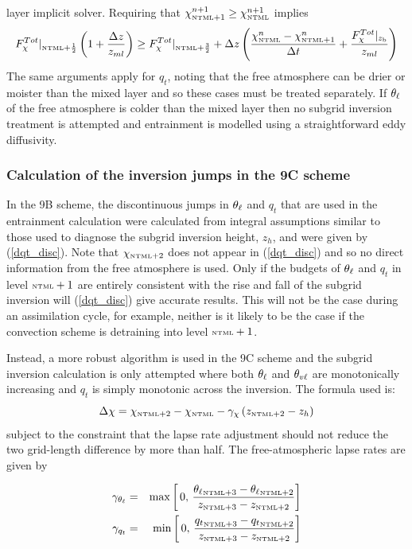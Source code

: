 \documentclass{UMDP_article}
\begin{document}
layer implicit solver.  Requiring that
$\chi_{\mbox{\tiny \rm NTML}+1}^{n+1}\geq\chi_{\mbox{\tiny \rm NTML}}^{n+1}$ implies
\begin{equation}
  F_{\chi}^{Tot}|_{ \mbox{\tiny \rm NTML}+\frac{1}{2} } 
  \left( 1+ \frac{\Delta z}{z_{ml}}\right)
  \geq F_{\chi}^{Tot}|_{ \mbox{\tiny \rm NTML}+\frac{3}{2} } + \Delta z \left(
    \frac{\chi_{\mbox{\tiny \rm NTML}}^{n}-\chi_{\mbox{\tiny \rm NTML}+1}^{n}}{\Delta t}
    + \frac{F_{\chi}^{Tot}|_{z_{\rm b}}}{z_{ml}}          \right)
\end{equation}
The same arguments apply for $q_t$, noting that the free atmosphere
can be drier or moister than the mixed layer and so these cases must
be treated separately.  If $\theta_{\ell}$ of the free atmosphere is colder
than the mixed layer then no subgrid inversion treatment is attempted
and entrainment is modelled using a straightforward eddy diffusivity.

\subsubsection{Calculation of the inversion jumps in the 9C scheme}

In the 9B scheme, the discontinuous jumps in $\theta_{\ell}$ and $q_t$ that
are used in the entrainment calculation were calculated from integral
assumptions similar to those used to diagnose the subgrid inversion
height, $z_h$, and were given by (\ref{dqt_disc}).  Note that
${\chi}_{\mbox{\tiny \rm NTML}+2}$ does not appear in (\ref{dqt_disc}) and so no
direct information from the free atmosphere is used.  Only if the
budgets of $\theta_{\ell}$ and $q_t$ in level $\mbox{\tiny \rm NTML}+1$ are entirely
consistent with the rise and fall of the subgrid inversion will
(\ref{dqt_disc}) give accurate results.  This will not be the case
during an assimilation cycle, for example, neither is it likely to be
the case if the convection scheme is detraining into level $\mbox{\tiny \rm NTML}+1$.

Instead, a more robust algorithm is used in the 9C scheme and the
subgrid inversion calculation is only attempted where both $\theta_{\ell}$
and $\theta_{v\ell}$ are monotonically increasing and $q_t$ is simply
monotonic across the inversion.  The formula used is:
\begin{equation}
  \Delta \chi = {\chi}_{\mbox{\tiny \rm NTML}+2} - {\chi}_{\mbox{\tiny \rm NTML}} 
              - \gamma_{\chi} \left( z_{\mbox{\tiny \rm NTML}+2} - z_h \right)
\label{dqt_disc_9c}
\end{equation}
subject to the constraint that the lapse rate adjustment should not
reduce the two grid-length difference by more than half.  The
free-atmospheric lapse rates are given by

\begin{eqnarray*}
  \gamma_{\theta_{\ell}} & =& {\rm max}\left[ \, 0, \, \frac{ {\theta_{\ell}}_{\mbox{\tiny \rm NTML}+3}-{\theta_{\ell}}_{\mbox{\tiny \rm NTML}+2} }
    { z_{\mbox{\tiny \rm NTML}+3} - z_{\mbox{\tiny \rm NTML}+2} }
  \right] \\
  \gamma_{q_t}    & =& {\rm min}\left[ \, 0, \, \frac{ {q_t}_{\mbox{\tiny \rm NTML}+3}-{q_t}_{\mbox{\tiny \rm NTML}+2} }
    { z_{\mbox{\tiny \rm NTML}+3} - z_{\mbox{\tiny \rm NTML}+2} }
  \right]
\end{eqnarray*}
\end{document}
